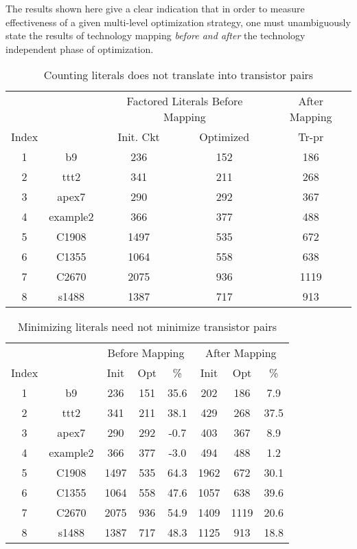 {\begin{pespace}
The results shown here give a clear indication that 
in order to measure effectiveness of a  
given multi-level optimization strategy, one must   
unambiguously state the results of 
technology mapping {\em before and after} the technology
independent phase of optimization.

\begin{table}
\centering
\begin{tabular}{|c|c|c|c|c|} \hline \hline
 &  & \multicolumn{2}{|c|}{ Factored Literals Before Mapping } &
\multicolumn{1}{|c|}{ After Mapping } \\ \cline{3-5}
Index &      & Init. Ckt & Optimized & Tr-pr \\ \hline \hline 
1 & b9       & 236       & 152       & 186  \\ \hline
2 & ttt2     & 341       & 211       & 268  \\ \hline
3 & apex7    & 290       & 292       & 367  \\ \hline
4 & example2 & 366       & 377       & 488  \\ \hline
5 & C1908    & 1497      & 535       & 672  \\ \hline
6 & C1355    & 1064      & 558       & 638  \\ \hline
7 & C2670    & 2075      & 936       & 1119 \\ \hline
8 & s1488    & 1387      & 717       & 913  \\ \hline \hline
\end{tabular}
\caption{Counting literals does not translate into transistor pairs}
\end{table}


\begin{table}
\centering
\begin{tabular}{|c|c|c|c|c|c|c|c|} \hline \hline
 &  & \multicolumn{3}{|c|}{ Before Mapping } &
\multicolumn{3}{|c|}{ After Mapping } \\ \cline{3-8}
Index &      & Init  & Opt  & \%   & Init  & Opt  & \%     \\ \hline \hline 
1 & b9       & 236   & 151  & 35.6 & 202   & 186  & 7.9   \\ \hline
2 & ttt2     & 341   & 211  & 38.1 & 429   & 268  & 37.5  \\ \hline
3 & apex7    & 290   & 292  & -0.7 & 403   & 367  & 8.9   \\ \hline
4 & example2 & 366   & 377  & -3.0 & 494   & 488  & 1.2   \\ \hline
5 & C1908    & 1497  & 535  & 64.3 & 1962  & 672  & 30.1  \\ \hline
6 & C1355    & 1064  & 558  & 47.6 & 1057  & 638  & 39.6  \\ \hline
7 & C2670    & 2075  & 936  & 54.9 & 1409  & 1119 & 20.6  \\ \hline
8 & s1488    & 1387  & 717  & 48.3 & 1125  & 913  & 18.8  \\ \hline \hline
\end{tabular}
\caption{Minimizing literals need not minimize transistor pairs}
\end{table}


\end{pespace}}
